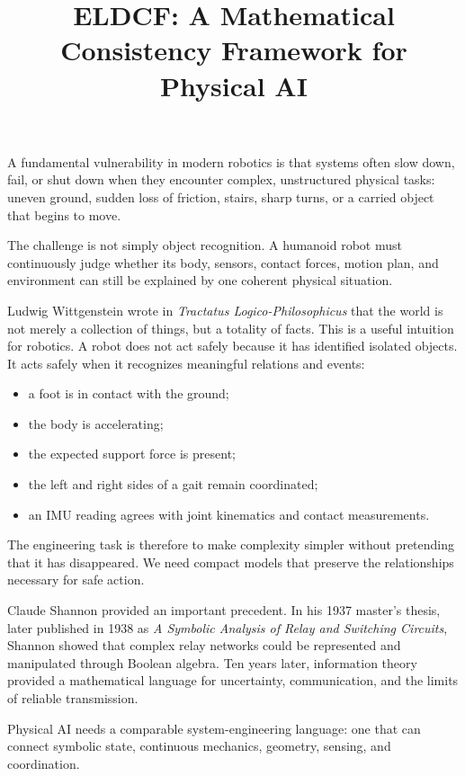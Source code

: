 \documentclass[11pt]{article}
\title{ELDCF: A Mathematical Consistency Framework for Physical AI}
\author{}
\date{}
\begin{document}
\maketitle

A fundamental vulnerability in modern robotics is that systems often slow down, fail, or shut down when they encounter complex, unstructured physical tasks: uneven ground, sudden loss of friction, stairs, sharp turns, or a carried object that begins to move.

The challenge is not simply object recognition. A humanoid robot must continuously judge whether its body, sensors, contact forces, motion plan, and environment can still be explained by one coherent physical situation.

Ludwig Wittgenstein wrote in \emph{Tractatus Logico-Philosophicus} that the world is not merely a collection of things, but a totality of facts. This is a useful intuition for robotics. A robot does not act safely because it has identified isolated objects. It acts safely when it recognizes meaningful relations and events:

\begin{itemize}[leftmargin=1.5em]
  \item a foot is in contact with the ground;
  \item the body is accelerating;
  \item the expected support force is present;
  \item the left and right sides of a gait remain coordinated;
  \item an IMU reading agrees with joint kinematics and contact measurements.
\end{itemize}

The engineering task is therefore to make complexity simpler without pretending that it has disappeared. We need compact models that preserve the relationships necessary for safe action.

Claude Shannon provided an important precedent. In his 1937 master's thesis, later published in 1938 as \emph{A Symbolic Analysis of Relay and Switching Circuits}, Shannon showed that complex relay networks could be represented and manipulated through Boolean algebra. Ten years later, information theory provided a mathematical language for uncertainty, communication, and the limits of reliable transmission.

Physical AI needs a comparable system-engineering language: one that can connect symbolic state, continuous mechanics, geometry, sensing, and coordination.
\end{document}
